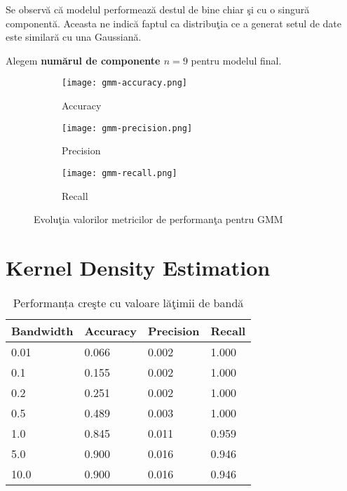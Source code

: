Se observă că modelul performează destul de bine chiar şi cu o singură componentă. 
Aceasta ne indică faptul ca distribuţia ce a generat setul de date este 
similară cu una Gaussiană.

Alegem \textbf{numărul de componente $n=9$} pentru modelul final.

\begin{figure}[htbp]
    \begin{minipage}{0.5\textwidth}
      \begin{subfigure}{\linewidth}
        \texttt{[image: gmm-accuracy.png]}
        \caption{Accuracy}
      \end{subfigure}
      
      \vspace{1em}
      
      \begin{subfigure}{\linewidth}
        \texttt{[image: gmm-precision.png]}
        \caption{Precision}
      \end{subfigure}
    \end{minipage}%
    \begin{minipage}{0.5\textwidth}
      \begin{subfigure}{\linewidth}
        \texttt{[image: gmm-recall.png]}
        \caption{Recall}
      \end{subfigure}
    \end{minipage}
    
    \caption{Evoluţia valorilor metricilor de performanţa pentru GMM}
\end{figure}
  

\section{Kernel Density Estimation}

\begin{table}[htb]
    \centering
    \begin{tabularx}{\textwidth}{
        |X
        |X
        |X
        |X|
    }
    \hline
    {Bandwidth} & {Accuracy} & {Precision} & {Recall} \\
    \hline
    \rowcolor{gray!20} 0.01 & 0.066 & 0.002 & 1.000 \\
    0.1 & 0.155 & 0.002 & 1.000 \\
    \rowcolor{gray!20} 0.2 & 0.251 & 0.002 & 1.000 \\
    0.5 & 0.489 & 0.003 & 1.000 \\
    \rowcolor{gray!20} 1.0 & 0.845 & 0.011 & 0.959 \\
    5.0 & 0.900 & 0.016 & 0.946 \\
    \rowcolor{gray!20} 10.0 & 0.900 & 0.016 & 0.946 \\
    \hline
    \end{tabularx}
    \caption{Performanța creşte cu valoare lăţimii de bandă}
\end{table}

